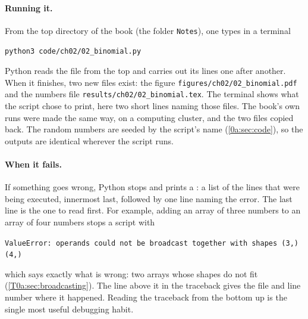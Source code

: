 \paragraph{Running it.} From the top directory of the book (the folder \texttt{Notes}), one types in a terminal
\begin{center}
\texttt{python3 code/ch02/02\_binomial.py}
\end{center}
Python reads the file from the top and carries out its lines one after another. When it finishes, two new files exist: the figure \texttt{figures/ch02/02\_binomial.pdf} and the numbers file \texttt{results/ch02/02\_binomial.tex}. The terminal shows what the script chose to print, here two short lines naming those files. The book's own runs were made the same way, on a computing cluster, and the two files copied back. The random numbers are seeded by the script's name (\cref{0a:sec:code}), so the outputs are identical wherever the script runs.

\paragraph{When it fails.} If something goes wrong, Python stops and prints a : a list of the lines that were being executed, innermost last, followed by one line naming the error. The last line is the one to read first. For example, adding an array of three numbers to an array of four numbers stops a script with
\begin{center}
\texttt{ValueError: operands could not be broadcast together with shapes (3,) (4,)}
\end{center}
which says exactly what is wrong: two arrays whose shapes do not fit (\cref{T0a:sec:broadcasting}). The line above it in the traceback gives the file and line number where it happened. Reading the traceback from the bottom up is the single most useful debugging habit.

